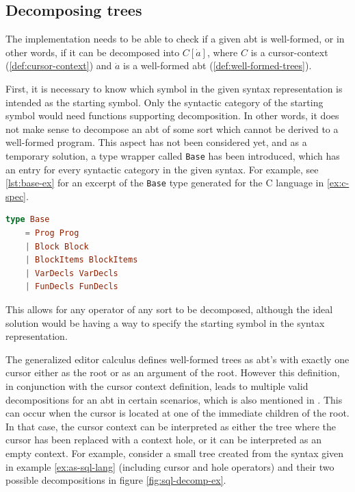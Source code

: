 \subsection{Decomposing trees}
The implementation needs to be able to check if a given abt is well-formed,
or in other words, if it can be decomposed into $C[\dot{a}]$, where $C$ is a
cursor-context (\cref{def:cursor-context}) and $\dot{a}$ is a
well-formed abt (\cref{def:well-formed-trees}).

First, it is necessary to know which symbol in the given syntax representation
is intended as the starting symbol. Only the syntactic category of the starting symbol
would need functions supporting decomposition.
In other words, it does not make sense to decompose an abt of some sort which
cannot be derived to a well-formed program.
This aspect has not been considered yet, and as a temporary solution,
a type wrapper called \texttt{Base} has been introduced, which has an entry for
every syntactic category in the given syntax. For example, see \cref{lst:base-ex}
for an excerpt of the \texttt{Base} type generated for the C language in
\cref{ex:c-spec}.

\begin{lstlisting}[language=elm,style=inline,caption={Example of the Base type},label={lst:base-ex}]
type Base
    = Prog Prog
    | Block Block
    | BlockItems BlockItems
    | VarDecls VarDecls
    | FunDecls FunDecls
\end{lstlisting}

This allows for any operator
of any sort to be decomposed, although the ideal solution would be having
a way to specify the starting symbol in the syntax representation.

The generalized editor calculus\cite{aalborg} defines well-formed trees as abt's
with exactly one cursor either as the root or as an argument of the root.
However this definition, in conjunction with the cursor context definition,
leads to multiple valid decompositions for an abt in certain scenarios,
which is also mentioned in \cite{aalborg}. This can occur when the cursor is located
at one of the immediate children of the root. In that case, the cursor context
can be interpreted as either the tree where the cursor has been replaced with a
context hole, or it can be interpreted as an empty context.
For example, consider a small tree created from the syntax given in
example \cref{ex:as-sql-lang} (including cursor and hole operators) and
their two possible decompositions in figure \cref{fig:sql-decomp-ex}.

